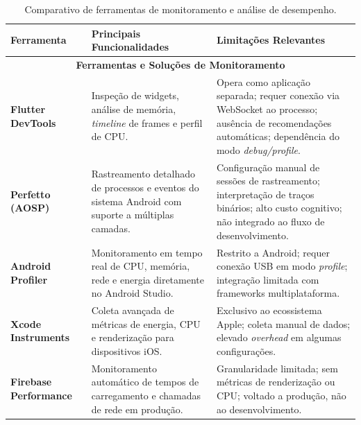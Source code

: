 \begin{table}[htbp]
\centering
\caption{Comparativo de ferramentas de monitoramento e análise de desempenho.}
\label{tab:ferramentas}
\renewcommand{\arraystretch}{1.3}
\begin{tabular}{|p{2.8cm}|p{4.5cm}|p{6.4cm}|}
\hline
\textbf{Ferramenta} & \textbf{Principais Funcionalidades} & \textbf{Limitações Relevantes} \\
\hline

\multicolumn{3}{|c|}{\textbf{Ferramentas e Soluções de Monitoramento}} \\
\hline

\textbf{Flutter DevTools}~\cite{flutterDevTools2026} &
Inspeção de widgets, análise de memória, \textit{timeline} de frames e perfil de CPU. &
Opera como aplicação separada; requer conexão via WebSocket ao processo; ausência de recomendações automáticas; dependência do modo \textit{debug/profile}. \\
\hline

\textbf{Perfetto (AOSP)}~\cite{aosp2024} &
Rastreamento detalhado de processos e eventos do sistema Android com suporte a múltiplas camadas. &
Configuração manual de sessões de rastreamento; interpretação de traços binários; alto custo cognitivo; não integrado ao fluxo de desenvolvimento. \\
\hline

\textbf{Android Profiler}~\cite{android2024} &
Monitoramento em tempo real de CPU, memória, rede e energia diretamente no Android Studio. &
Restrito a Android; requer conexão USB em modo \textit{profile}; integração limitada com frameworks multiplataforma. \\
\hline

\textbf{Xcode Instruments}~\cite{apple2024} &
Coleta avançada de métricas de energia, CPU e renderização para dispositivos iOS. &
Exclusivo ao ecossistema Apple; coleta manual de dados; elevado \textit{overhead} em algumas configurações. \\
\hline

\textbf{Firebase Performance}~\cite{firebase2026} &
Monitoramento automático de tempos de carregamento e chamadas de rede em produção. &
Granularidade limitada; sem métricas de renderização ou CPU; voltado a produção, não ao desenvolvimento. \\
\hline

\end{tabular}
\vspace{-0.4cm}
\end{table}

